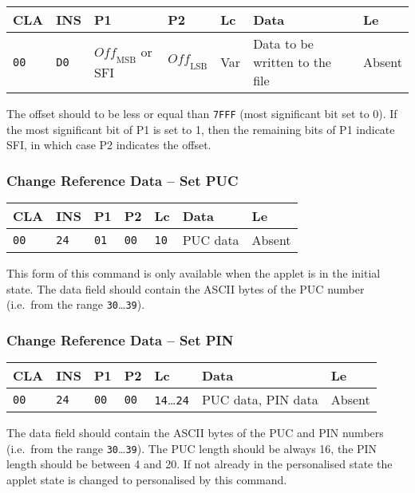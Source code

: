 \documentclass{article}
\begin{document}
\begin{flushleft}
\begin{tabular}{|l|l|l|l|l|l|l|}
\hline
CLA & INS & P1 & P2 & Lc & Data & Le \\
\hline
\texttt{00} & \texttt{D0} &
$\mathit{Off}_{\mathrm{MSB}}$ or SFI & $\mathit{Off}_{\mathrm{LSB}}$ &
Var & Data to be written to the file & Absent \\
\hline
\end{tabular}
\end{flushleft}
The offset should to be less or equal than \texttt{7FFF} (most
significant bit set to 0). If the most significant bit of P1 is set to
1, then the remaining bits of P1 indicate SFI, in which case P2
indicates the offset.


\subsubsection{Change Reference Data -- Set PUC}

\begin{flushleft}
\begin{tabular}{|l|l|l|l|l|l|l|}
\hline
CLA & INS & P1 & P2 & Lc & Data & Le \\
\hline
\texttt{00} & \texttt{24} & \texttt{01} & \texttt{00} &
\texttt{10} & PUC data & Absent \\
\hline
\end{tabular}
\end{flushleft}
This form of this command is only available when the applet is in the
\textsf{initial} state. The data field should contain the ASCII bytes
of the PUC number (i.e.\ from the range \texttt{30}\dots\texttt{39}).


\subsubsection{Change Reference Data -- Set PIN}\label{sec:pin}

\begin{flushleft}
\begin{tabular}{|l|l|l|l|l|l|l|}
\hline
CLA & INS & P1 & P2 & Lc & Data & Le \\
\hline
\texttt{00} & \texttt{24} & \texttt{00} & \texttt{00} &
\texttt{14}\dots\texttt{24} & PUC data, PIN data & Absent \\
\hline
\end{tabular}
\end{flushleft}
The data field should contain the ASCII bytes of the PUC and PIN
numbers (i.e.\ from the range \texttt{30}\dots\texttt{39}).  The PUC
length should be always 16, the PIN length should be between 4 and 20.
If not already in the \textsf{personalised} state the applet state is
changed to \textsf{personalised} by this command.
\end{document}
